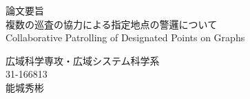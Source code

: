 \documentclass[a4paper,12pt]{jsarticle}
\begin{document}
  \begin{center}
    {\LARGE 論文要旨}\\
    \vfill
    {\LARGE 複数の巡査の協力による指定地点の警邏について}\\
    {\normalsize Collaborative Patrolling of Designated Points on Graphs}
  \end{center}

  \begin{flushright}
  {\large
  広域科学専攻・広域システム科学系 \\
  31-166813 \\
  能城秀彬
  }
  \end{flushright} 
  \vspace{30pt}

  

  \thispagestyle{empty}  %
\end{document}
